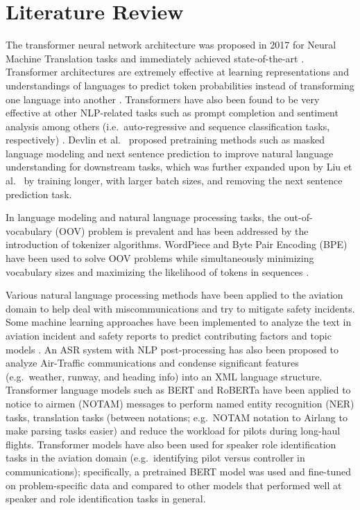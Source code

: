 \documentclass[12pt]{article}
\begin{document}
\section{Literature Review}\label{sec:lit_review}
The transformer neural network architecture was proposed in 2017 for Neural Machine Translation tasks and immediately achieved state-of-the-art
\cite{vaswani_attention_2017}. Transformer architectures are extremely effective at learning representations and understandings of languages to
predict token probabilities instead of transforming one language into another \cite{devlin_bert_2019,liu_roberta_2019}. Transformers have also been
found to be very effective at other NLP-related tasks such as prompt completion and sentiment analysis among others (i.e.~auto-regressive and sequence
classification tasks, respectively) \cite{lewis_bart_2019,radford_improving_2018}. Devlin et al.~\cite{devlin_bert_2019} proposed pretraining methods
such as masked language modeling and next sentence prediction to improve natural language understanding for downstream tasks, which was further
expanded upon by Liu et al.~\cite{liu_roberta_2019} by training longer, with larger batch sizes, and removing the next sentence prediction task.

In language modeling and natural language processing tasks, the out-of-vocabulary (OOV) problem is prevalent and has been addressed by the
introduction of tokenizer algorithms. WordPiece and Byte Pair Encoding (BPE) have been used to solve OOV problems while simultaneously minimizing
vocabulary sizes and maximizing the likelihood of tokens in sequences \cite{wu_googles_2016,schuster_japanese_2012,sennrich_neural_2016}.

Various natural language processing methods have been applied to the aviation domain to help deal with miscommunications and try to mitigate safety
incidents\cite{ragnarsdottir_language_2003,tanguy_natural_2016,madeira_machine_2021}. Some machine learning approaches have been implemented to
analyze the text in aviation incident and safety reports to predict contributing factors and topic models
\cite{tanguy_natural_2016,madeira_machine_2021}. An ASR system with NLP post-processing has also been proposed to analyze Air-Traffic communications
and condense significant features (e.g.~weather, runway, and heading info) into an XML language structure\cite{ragnarsdottir_language_2003}.
Transformer language models such as BERT and RoBERTa have been applied to notice to airmen (NOTAM) messages to perform named entity recognition (NER)
tasks, translation tasks (between notations; e.g.~NOTAM notation to Airlang to make parsing tasks easier) and reduce the workload for pilots during
long-haul flights\cite{arnold_knowledge_2022}. Transformer models have also been used for speaker role identification tasks in the aviation domain
(e.g.~identifying pilot versus controller in communications); specifically, a pretrained BERT model was used and fine-tuned on problem-specific data
and compared to other models that performed well at speaker and role identification tasks in general\cite{guo_comparative_2022}.
\end{document}
